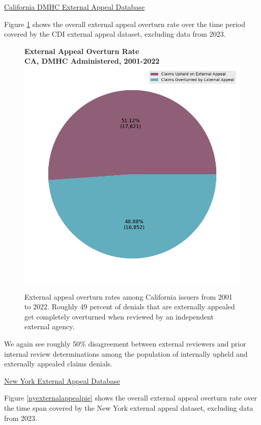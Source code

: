 \documentclass[12pt, a4paper,twoside,parskip=full]{report}
\theoremstyle{plain} %
\theoremstyle{definition} %
\theoremstyle{remark} %
\numberwithin{equation}{chapter}
\begin{document}
		\clearpage
	
	
		\underline{California DMHC External Appeal Database}

		Figure \ref{cadmhcexternalappealpie} shows the overall external appeal overturn rate over the time period covered by the CDI external appeal dataset, excluding data from 2023.
		
		
		\begin{figure}[h!]
			\centering
			\textbf{External Appeal Overturn Rate}\\
			\textbf{CA, DMHC Administered, 2001-2022}\\
			\includegraphics[width=.4\textwidth]{images/ca_dmhc_external_appeals/external_appeal_success_rates.png}
			\caption{External appeal overturn rates among California issuers from 2001 to 2022. Roughly 49 percent of denials that are externally appealed get completely overturned when reviewed by an independent external agency.}
			\label{cadmhcexternalappealpie}
		\end{figure}
	
		\clearpage
	
		We again see roughly 50\% disagreement between external reviewers and prior internal review determinations among the population of internally upheld and externally appealed claims denials.
		
		\underline{New York External Appeal Database}
		
		Figure \ref{nyexternalappealpie} shows the overall external appeal overturn rate over the time span covered by the New York external appeal dataset, excluding data from 2023.
		
\end{document}
